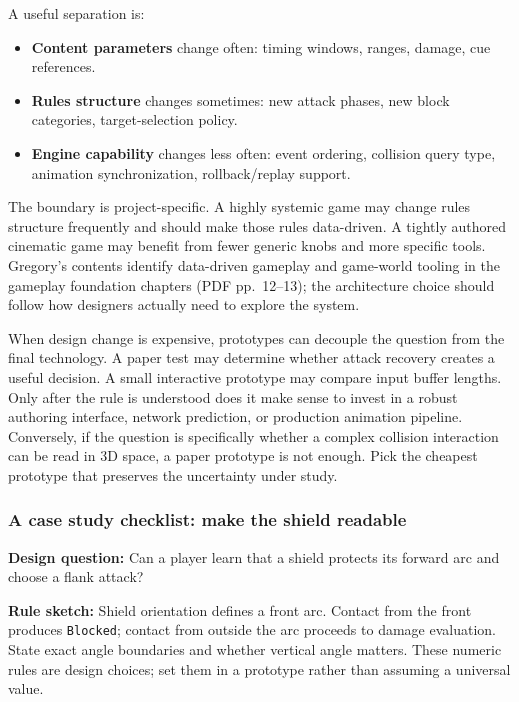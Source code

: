A useful separation is:

\begin{itemize}
\tightlist
\item
  \textbf{Content parameters} change often: timing windows, ranges, damage, cue references.
\item
  \textbf{Rules structure} changes sometimes: new attack phases, new block categories, target-selection policy.
\item
  \textbf{Engine capability} changes less often: event ordering, collision query type, animation synchronization, rollback/replay support.
\end{itemize}

The boundary is project-specific. A highly systemic game may change rules structure frequently and should make those rules data-driven. A tightly authored cinematic game may benefit from fewer generic knobs and more specific tools. Gregory's contents identify data-driven gameplay and game-world tooling in the gameplay foundation chapters (PDF pp.~12--13); the architecture choice should follow how designers actually need to explore the system.

When design change is expensive, prototypes can decouple the question from the final technology. A paper test may determine whether attack recovery creates a useful decision. A small interactive prototype may compare input buffer lengths. Only after the rule is understood does it make sense to invest in a robust authoring interface, network prediction, or production animation pipeline. Conversely, if the question is specifically whether a complex collision interaction can be read in 3D space, a paper prototype is not enough. Pick the cheapest prototype that preserves the uncertainty under study.

\subsubsection{A case study checklist: make the shield readable}\label{a-case-study-checklist-make-the-shield-readable}

\textbf{Design question:} Can a player learn that a shield protects its forward arc and choose a flank attack?

\textbf{Rule sketch:} Shield orientation defines a front arc. Contact from the front produces \texttt{Blocked}; contact from outside the arc proceeds to damage evaluation. State exact angle boundaries and whether vertical angle matters. These numeric rules are design choices; set them in a prototype rather than assuming a universal value.

